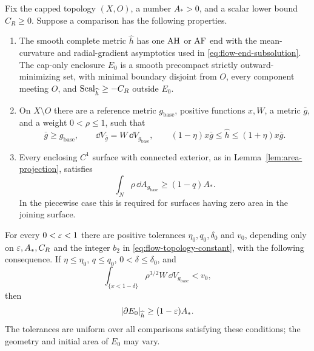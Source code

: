 \begin{proposition}\label{prop:area-transfer}
Fix the capped topology $(X,O)$, a number $A_*>0$, and a scalar lower
bound $C_R\ge0$.  Suppose a comparison has the following properties.
\begin{enumerate}[label=\textup{(\roman*)}]
\item The smooth complete metric $\widehat h$ has one $\mathrm{AH}$ or $\mathrm{AF}$
end with the mean-curvature and radial-gradient asymptotics used in
\eqref{eq:flow-end-subsolution}.  The cap-only enclosure $E_0$ is a
smooth precompact strictly outward-minimizing set, with minimal
boundary disjoint from $O$, every component meeting $O$, and
$\operatorname{Scal}_{\widehat h}\ge-C_R$ outside $E_0$.
\item On $X\setminus O$ there are a reference metric
$g_{\mathrm{base}}$, positive functions $x,W$, a metric $\bar g$, and
a weight $0<\rho\le1$, such that
\begin{equation}\label{eq:flow-metric-comparison}
 \bar g\ge g_{\mathrm{base}},\qquad
 \dd V_{\bar g}=W\,\dd V_{g_{\mathrm{base}}},\qquad
 (1-\eta)x\bar g\le\widehat h\le(1+\eta)x\bar g.
\end{equation}
\item Every enclosing $C^1$ surface with connected exterior, as in
Lemma~\ref{lem:area-projection}, satisfies
\begin{equation}\label{eq:flow-abstract-projection}
 \int_N\rho\,\dd A_{g_{\mathrm{base}}}\ge(1-q)A_*.
\end{equation}
In the piecewise case this is required for surfaces having zero area
in the joining surface.
\end{enumerate}
For every $0<\varepsilon<1$ there are positive tolerances
$\eta_0,q_0,\delta_0$ and $v_0$, depending only on
$\varepsilon,A_*,C_R$ and the integer $b_2$ in
\eqref{eq:flow-topology-constant}, with the following consequence.
If $\eta\le\eta_0$, $q\le q_0$, $0<\delta\le\delta_0$, and
\begin{equation}\label{eq:flow-bad-volume}
 \int_{\{x<1-\delta\}}\rho^{3/2}W\,\dd V_{g_{\mathrm{base}}}<v_0,
\end{equation}
then
\begin{equation}\label{eq:flow-area-conclusion}
 |\partial E_0|_{\widehat h}\ge(1-\varepsilon)A_*.
\end{equation}
The tolerances are uniform over all comparisons satisfying these
conditions; the geometry and initial area of $E_0$ may vary.
\end{proposition}

